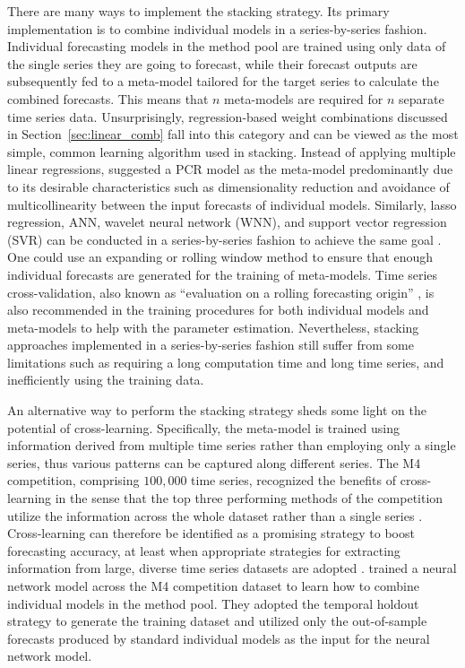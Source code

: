 \documentclass[11pt]{article}
\begin{document}
There are many ways to implement the stacking strategy. Its primary implementation is to combine individual models in a series-by-series fashion. Individual forecasting models in the method pool are trained using only data of the single series they are going to forecast, while their forecast outputs are subsequently fed to a meta-model tailored for the target series to calculate the combined forecasts. This means that $n$ meta-models are required for $n$ separate time series data. Unsurprisingly, regression-based weight combinations discussed in Section~\ref{sec:linear_comb} \citep[e.g.,][]{Granger1984-jc,Gunter1992-go} fall into this category and can be viewed as the most simple, common learning algorithm used in stacking. Instead of applying multiple linear regressions, \citet{Moon2020-ls} suggested a PCR model as the meta-model predominantly due to its desirable characteristics such as dimensionality reduction and avoidance of multicollinearity between the input forecasts of individual models. Similarly, lasso regression, ANN, wavelet neural network (WNN), and support vector regression (SVR) can be conducted in a series-by-series fashion to achieve the same goal \citep[e.g.,][]{Donaldson1996-um,Conflitti2015-fq,Ribeiro2019-wk,Ribeiro2020-mj}. One could use an expanding or rolling window method to ensure that enough individual forecasts are generated for the training of meta-models. Time series cross-validation, also known as ``evaluation on a rolling forecasting origin'' \citep{Hyndman2021-tx}, is also recommended in the training procedures for both individual models and meta-models to help with the parameter estimation. Nevertheless, stacking approaches implemented in a series-by-series fashion still suffer from some limitations such as requiring a long computation time and long time series, and inefficiently using the training data.

An alternative way to perform the stacking strategy sheds some light on the potential of cross-learning. Specifically, the meta-model is trained using information derived from multiple time series rather than employing only a single series, thus various patterns can be captured along different series. The M4 competition, comprising $100,000$ time series, recognized the benefits of cross-learning in the sense that the top three performing methods of the competition utilize the information across the whole dataset rather than a single series \citep{Makridakis2020-hu}. Cross-learning can therefore be identified as a promising strategy to boost forecasting accuracy, at least when appropriate strategies for extracting information from large, diverse time series datasets are adopted \citep{Kang2020-sa,Semenoglou2020-xx}. \citet{Zhao2020-ep} trained a neural network model across the M4 competition dataset to learn how to combine individual models in the method pool. They adopted the temporal holdout strategy to generate the training dataset and utilized only the out-of-sample forecasts produced by standard individual models as the input for the neural network model.
\end{document}
